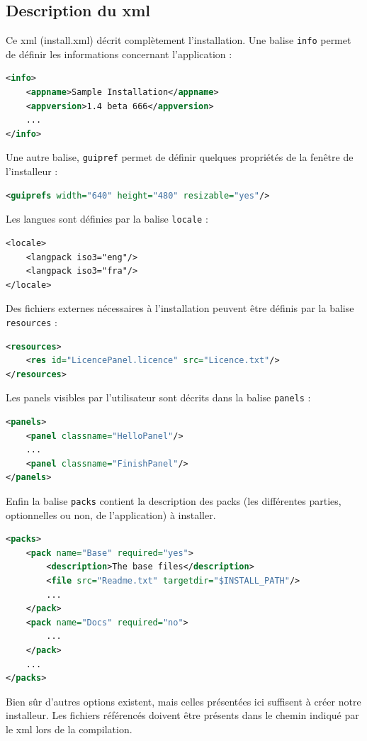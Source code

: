 \subsection{Description du xml}
Ce xml (install.xml) décrit complètement l'installation.
Une balise \verb|info| permet de définir les informations concernant l'application : 
\begin{lstlisting}[language=xml]
<info>
	<appname>Sample Installation</appname>
	<appversion>1.4 beta 666</appversion>
	...
</info>
\end{lstlisting}
Une autre balise, \verb|guipref| permet de définir quelques propriétés de la fenêtre de l'installeur :
\begin{lstlisting}[language=xml]
<guiprefs width="640" height="480" resizable="yes"/>
\end{lstlisting}
Les langues sont définies par la balise \verb|locale| :
\begin{lstlisting}
<locale>
	<langpack iso3="eng"/>
	<langpack iso3="fra"/>
</locale>
\end{lstlisting}
Des fichiers externes nécessaires à l'installation peuvent être définis par la balise \verb|resources| :
\begin{lstlisting}[language=xml]
<resources>
	<res id="LicencePanel.licence" src="Licence.txt"/>
</resources>
\end{lstlisting}
Les panels visibles par l'utilisateur sont décrits dans la balise \verb|panels| :
\begin{lstlisting}[language=xml]
<panels>
	<panel classname="HelloPanel"/>
	...
	<panel classname="FinishPanel"/>
</panels>
\end{lstlisting}
Enfin la balise \verb|packs| contient la description des packs (les différentes parties, optionnelles ou non, de l'application) à installer.
\begin{lstlisting}[language=xml]
<packs>
	<pack name="Base" required="yes">
		<description>The base files</description>
		<file src="Readme.txt" targetdir="$INSTALL_PATH"/>
		...
	</pack>
	<pack name="Docs" required="no">
		...
	</pack>
	...
</packs>
\end{lstlisting}
Bien sûr d'autres options existent, mais celles présentées ici suffisent à créer notre installeur.
Les fichiers référencés doivent être présents dans le chemin indiqué par le xml lors de la compilation.
